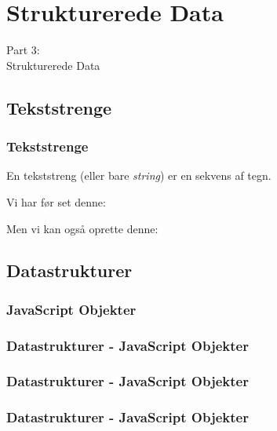 \section{Strukturerede Data}
\begin{frame}
    \vspace{25mm}
    \begin{center}
        \Huge{Part 3:\\Strukturerede Data}
    \end{center}
\end{frame}

\subsection{Tekststrenge}
\begin{frame}
    \frametitle{Tekststrenge}
    \vspace{3mm}
    En tekststreng (eller bare \textsl{string}) er en sekvens af tegn.
    
    \vspace{5mm}
    Vi har før set denne:
    \vspace{-1mm}
    \begin{center}
    \end{center}
    
    Men vi kan også oprette denne:
    \vspace{-1mm}
    \begin{center}
    \end{center}
\end{frame}

\subsection{Datastrukturer}
\subsubsection{JavaScript Objekter}

\begin{frame}
    \frametitle{Datastrukturer - JavaScript Objekter}
    \vspace{-1mm}
    \begin{center}
    \end{center}
\end{frame}
\begin{frame}
    \frametitle{Datastrukturer - JavaScript Objekter}
    \vspace{-1mm}
    \begin{center}
    \end{center}
\end{frame}
\begin{frame}
    \frametitle{Datastrukturer - JavaScript Objekter}
    \vspace{-1mm}
    \begin{center}
    \end{center}
\end{frame}

